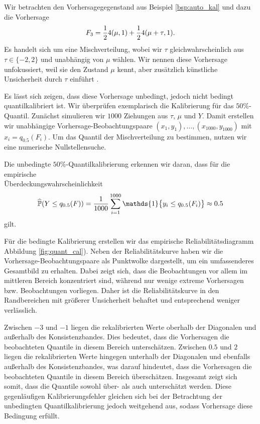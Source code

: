 \begin{bsp}\label{bsp:quant_cal}
Wir betrachten den Vorhersagegegenstand aus Beispiel \ref{bsp:auto_kal} und dazu die Vorhersage 
\[
F_3=\frac{1}{2}4(\mu,1)+\frac{1}{2}4(\mu + \tau,1).
\]
Es handelt sich um eine Mischverteilung, wobei wir $\tau$ gleichwahrscheinlich aus $\tau \in \{-2,2\}$ und unabhängig von $\mu$ wählen. Wir nennen diese Vorhersage unfokussiert, weil sie den Zustand $\mu$ kennt, aber zusätzlich künstliche Unsicherheit durch $\tau$ einführt \parencite[Example 2.2]{gneiting2023regression}.

Es lässt sich zeigen, dass diese Vorhersage unbedingt, jedoch nicht bedingt quantilkalibriert ist.  Wir überprüfen exemplarisch die Kalibrierung für das $50\%$-Quantil. Zunächst simulieren wir $1000$ Ziehungen aus $\tau$, $\mu$ und $Y$. Damit erstellen wir unabhängige Vorhersage-Beobachtungspaare $(x_1,y_1),\dotsc, (x_{1000},y_{1000})$ mit $x_i = q_{0.5}(F_i)$. Um das Quantil der Mischverteilung zu bestimmen, nutzen wir eine numerische Nullstellensuche.

Die unbedingte $50\%$-Quantilkalibrierung erkennen wir daran, dass für die empirische \\ Überdeckungswahrscheinlichkeit
\[
\widehat{\PW}(Y\leq q_{0.5}(F)) = \frac{1}{1000} \sum_{i=1}^{1000}\mathds{1}\big\{y_i\leq q_{0.5}(F_i)\big\} \approx 0.5
\]
gilt.

Für die bedingte Kalibrierung erstellen wir das empirische Reliabilitätsdiagramm Abbildung \ref{fig:quant_cal}). Neben der Reliabilitätskurve haben wir die Vorhersage-Beobachtungspaare als Punktwolke dargestellt, um ein umfassenderes Gesamtbild zu erhalten. Dabei zeigt sich, dass die Beobachtungen vor allem im mittleren Bereich konzentriert sind, während nur wenige extreme Vorhersagen bzw. Beobachtungen vorliegen. Daher ist die Reliabilitätskurve in den Randbereichen mit größerer Unsicherheit behaftet und entsprechend weniger verlässlich. 

Zwischen $-3$ und $-1$ liegen die rekalibrierten Werte oberhalb der Diagonalen und außerhalb des Konsistenzbandes. Dies bedeutet, dass die Vorhersagen die beobachteten Quantile in diesem Bereich unterschätzen. Zwischen $0.5$ und $2$ liegen die rekalibrierten Werte hingegen unterhalb der Diagonalen und ebenfalls außerhalb des Konsistenzbandes, was darauf hindeutet, dass die Vorhersagen die beobachteten Quantile in diesem Bereich überschätzen. Insgesamt zeigt sich somit, dass die Quantile sowohl über- als auch unterschätzt werden. Diese gegenläufigen Kalibrierungsfehler gleichen sich bei der Betrachtung der unbedingten Quantilkalibrierung jedoch weitgehend aus, sodass Vorhersage diese Bedingung erfüllt.

\end{bsp}

